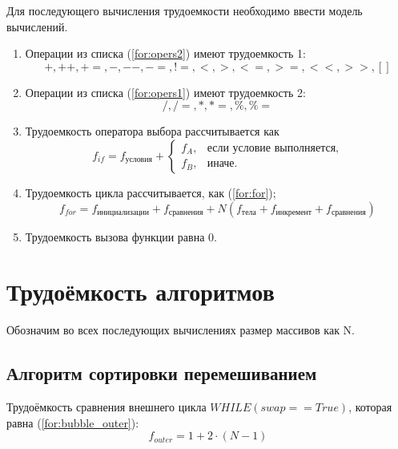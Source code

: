 Для последующего вычисления трудоемкости необходимо ввести модель вычислений.
\begin{enumerate}
	\item Операции из списка (\ref{for:opers2}) имеют трудоемкость 1:
	\begin{equation}
		\label{for:opers2}
		+, ++, +=, -, {-}-, -=, !=, <, >, <=, >=, <<, >>, []
	\end{equation}
	\item Операции из списка (\ref{for:opers1}) имеют трудоемкость 2:
	\begin{equation}
		\label{for:opers1}
		/, /=, *, *= ,\%, \%=
	\end{equation}
	\item Трудоемкость оператора выбора  рассчитывается как
	\begin{equation}
		\label{for:if}
		f_{if} = f_{\text{условия}} +
		\begin{cases}
			f_A, & \text{если условие выполняется,}\\
			f_B, & \text{иначе.}
		\end{cases}
	\end{equation}
	\item Трудоемкость цикла рассчитывается, как (\ref{for:for});
	\begin{equation}
		\label{for:for}
		f_{for} = f_{\text{инициализации}} + f_{\text{сравнения}} + N(f_{\text{тела}} + f_{\text{инкремент}} + f_{\text{сравнения}})
	\end{equation}
	\item Трудоемкость вызова функции равна 0.
\end{enumerate}

\section{Трудоёмкость алгоритмов}

Обозначим во всех последующих вычислениях размер массивов как N.

\subsection{Алгоритм сортировки перемешиванием}


Трудоёмкость сравнения внешнего цикла $WHILE(swap == True)$, которая равна (\ref{for:bubble_outer}):
\begin{equation}
	\label{for:bubble_outer}
	f_{outer} = 1 + 2 \cdot (N - 1)
\end{equation}

